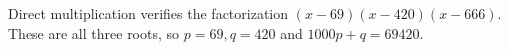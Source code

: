 Direct multiplication verifies the factorization $(x-69)(x-420)(x-666)$. These are all three roots, so $p=69,q=420$ and $\boxed{1000p+q=69420}$.
